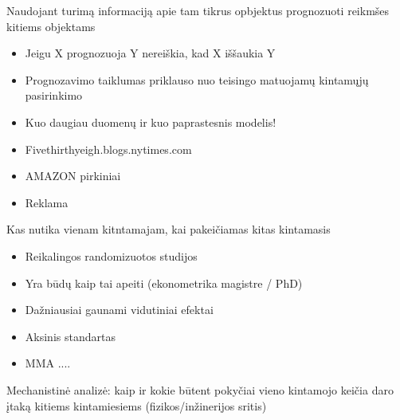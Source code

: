 \documentclass[11pt,xcolor=table]{beamer}
\begin{document}
\begin{frame}
Naudojant turimą informaciją apie tam tikrus opbjektus prognozuoti reikmšes kitiems objektams
\begin{itemize}
\item Jeigu X prognozuoja Y nereiškia, kad X iššaukia Y
\item Prognozavimo taiklumas priklauso nuo teisingo matuojamų kintamųjų pasirinkimo
\item Kuo daugiau duomenų ir kuo paprastesnis modelis!
\item Fivethirthyeigh.blogs.nytimes.com 
\item AMAZON pirkiniai
\item Reklama
\end{itemize}
\end{frame}
\begin{frame}
Kas nutika vienam kitntamajam, kai pakeičiamas kitas kintamasis
\begin{itemize}
\item Reikalingos randomizuotos studijos
\item Yra būdų kaip tai apeiti (ekonometrika magistre / PhD)
\item Dažniausiai gaunami vidutiniai efektai
\item Aksinis standartas
\item MMA ....
\end{itemize}
\end{frame}
\begin{frame}
Mechanistinė analizė: kaip ir kokie būtent pokyčiai vieno kintamojo keičia daro įtaką kitiems kintamiesiems (fizikos/inžinerijos sritis)
\end{frame}
\end{document}
